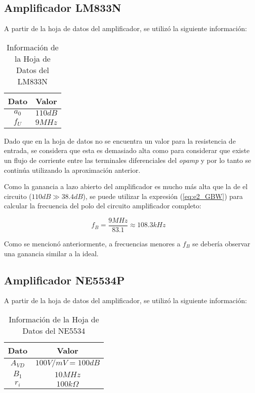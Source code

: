 \subsection{Amplificador LM833N}
A partir de la hoja de datos del amplificador, se utilizó la siguiente información:

\begin{table}[ht]
\begin{center}
\begin{tabular}{||c|c||}
\hline
	Dato	&	Valor		\\
	\hline
	$a_0$	&	$110 dB$	\\
	$f_U$	&	$9 MHz$		\\
\hline
\end{tabular}
\end{center}
\caption{Información de la Hoja de Datos del LM833N}
\label{tab:e2_info_lm}
\end{table}

Dado que en la hoja de datos no se encuentra un valor para la resistencia de entrada, se considera que esta es demasiado alta como para considerar que existe un flujo de corriente entre las terminales diferenciales del \textit{opamp} y por lo tanto se continúa utilizando la aproximación anterior.

Como la ganancia a lazo abierto del amplificador es mucho más alta que la de el circuito ($110 dB \gg 38.4 dB$), se puede utilizar la expresión (\ref{eq:e2_GBW}) para calcular la frecuencia del polo del circuito amplificador completo:

\begin{equation}
f_B= \frac{9 MHz}{83.1} \approx 108.3 kHz
\label{val:e2_fB_lm}
\end{equation}

Como se mencionó anteriormente, a frecuencias menores a $f_B$ se debería observar una ganancia similar a la ideal.

\newpage

\subsection{Amplificador NE5534P}
A partir de la hoja de datos del amplificador, se utilizó la siguiente información:

\begin{table}[ht]
\begin{center}
\begin{tabular}{||c|c||}
\hline
	Dato	&	Valor		\\
	\hline
	$A_{VD}$	&	$100 V/mV = 100 dB$	\\
	$B_1$	&	$10 MHz$		\\
	$r_i$	&	$100 k\Omega$	\\
\hline
\end{tabular}
\end{center}
\caption{Información de la Hoja de Datos del NE5534}
\label{tab:e2_info_ne}
\end{table}

